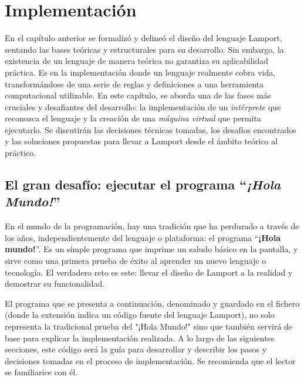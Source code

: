 \chapter{Implementación}

En el capítulo anterior se formalizó y delineó el diseño del lenguaje Lamport, sentando las bases teóricas y estructurales para su desarrollo. Sin embargo, la existencia de un lenguaje de manera teórica no garantiza su aplicabilidad práctica. Es en la implementación donde un lenguaje realmente cobra vida, transformándose de una serie de reglas y definiciones a una herramienta computacional utilizable. En este capítulo, se aborda una de las fases más cruciales y desafiantes del desarrollo: la implementación de un \textit{intérprete} que reconozca el lenguaje y la creación de una \textit{máquina virtual} que permita ejecutarlo. Se discutirán las decisiones técnicas tomadas, los desafíos encontrados y las soluciones propuestas para llevar a Lamport desde el ámbito teórico al práctico.

\section{El gran desafío: ejecutar el programa ``\textit{¡Hola Mundo!}''}
En el mundo de la programación, hay una tradición que ha perdurado a través de los años, independientemente del lenguaje o plataforma: el programa ``\textbf{¡Hola mundo!}''. Es un simple programa que imprime un saludo básico en la pantalla, y sirve como una primera prueba de éxito al aprender un nuevo lenguaje o tecnología. El verdadero reto es este: llevar el diseño de Lamport a la realidad y demostrar su funcionalidad.

\vspace{0.5cm}


El programa que se presenta a continuación, denominado  y guardado en el fichero  (donde la extensión  indica un código fuente del lenguaje Lamport), no solo representa la tradicional prueba del "¡Hola Mundo!" sino que también servirá de base para explicar la implementación realizada. A lo largo de las siguientes secciones, este código será la guía para desarrollar y describir los pasos y decisiones tomadas en el proceso de implementación. Se recomienda que el lector se familiarice con él.

\newpage

